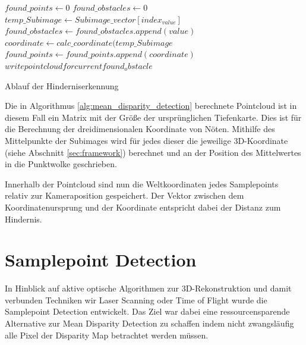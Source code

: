 \begin{algorithm}[h]
\label{alg:mean_disparity_detection}
\begin{algorithmic}[1]
		\State $found\_points \gets 0$
		\State $found\_obstacles \gets 0$
				\State $temp\_Subimage \gets Subimage\_vector[index_{value}]$
				\State $found\_obstacles \gets found\_obstacles.append(value)$
				\State $coordinate \gets calc\_coordinate(temp\_Subimage$
				\State $found\_points \gets found\_points.append(coordinate)$
			\EndIf
		\EndFor
			\State $write pointcloud for current found_obstacle$
		\EndIf 
    \EndProcedure
\end{algorithmic}
\caption{Ablauf der Hinderniserkennung}
\end{algorithm}

\noindent
Die in Algorithmus \ref{alg:mean_disparity_detection} berechnete Pointcloud ist in diesem Fall ein Matrix mit der Größe der ursprünglichen Tiefenkarte. Dies ist für die Berechnung der dreidimensionalen Koordinate von Nöten. Mithilfe des Mittelpunkte der Subimages wird für jedes dieser die jeweilige 3D-Koordinate (siehe Abschnitt \ref{sec:framework}) berechnet und an der Position des Mittelwertes in die Punktwolke geschrieben.

\noindent
Innerhalb der Pointcloud sind nun die Weltkoordinaten jedes Samplepoints relativ zur Kameraposition gespeichert. Der Vektor zwischen dem Koordinatenursprung und der Koordinate entspricht dabei der Distanz zum Hindernis.

\section{Samplepoint Detection}
\label{sec:samplepoint_detection}
In Hinblick auf aktive optische Algorithmen zur 3D-Rekonstruktion und damit verbunden Techniken wir Laser Scanning oder Time of Flight wurde die Samplepoint Detection entwickelt. Das Ziel war dabei eine ressourcensparende Alternative zur Mean Disparity Detection zu schaffen indem nicht zwangsläufig alle Pixel der Disparity Map betrachtet werden müssen.\\

